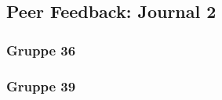 \subsection{Peer Feedback: Journal 2}
\clearpage
\subsubsection{Gruppe 36}



\clearpage
\subsubsection{Gruppe 39}

